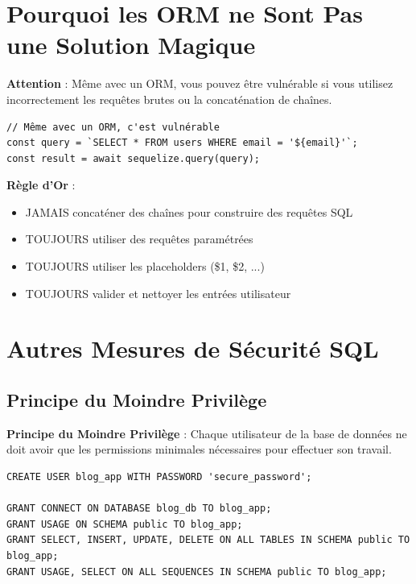 \section{Pourquoi les ORM ne Sont Pas une Solution Magique}

\begin{warningbox}
    \textbf{Attention} : Même avec un ORM, vous pouvez être vulnérable si vous utilisez incorrectement les requêtes brutes ou la concaténation de chaînes.
\end{warningbox}

\begin{lstlisting}[style=javascript, caption=Code vulnérable même avec ORM]
// Même avec un ORM, c'est vulnérable
const query = `SELECT * FROM users WHERE email = '${email}'`;
const result = await sequelize.query(query);
\end{lstlisting}

\begin{bestpracticebox}
    \textbf{Règle d'Or} :
    \begin{itemize}
        \item JAMAIS concaténer des chaînes pour construire des requêtes SQL
        \item TOUJOURS utiliser des requêtes paramétrées
        \item TOUJOURS utiliser les placeholders (\$1, \$2, ...)
        \item TOUJOURS valider et nettoyer les entrées utilisateur
    \end{itemize}
\end{bestpracticebox}

\section{Autres Mesures de Sécurité SQL}

\subsection{Principe du Moindre Privilège}

\begin{definitionbox}
    \textbf{Principe du Moindre Privilège} : Chaque utilisateur de la base de données ne doit avoir que les permissions minimales nécessaires pour effectuer son travail.
\end{definitionbox}

\begin{lstlisting}[style=sql, caption=Création d'un utilisateur avec permissions limitées]
CREATE USER blog_app WITH PASSWORD 'secure_password';

GRANT CONNECT ON DATABASE blog_db TO blog_app;
GRANT USAGE ON SCHEMA public TO blog_app;
GRANT SELECT, INSERT, UPDATE, DELETE ON ALL TABLES IN SCHEMA public TO blog_app;
GRANT USAGE, SELECT ON ALL SEQUENCES IN SCHEMA public TO blog_app;
\end{lstlisting}

